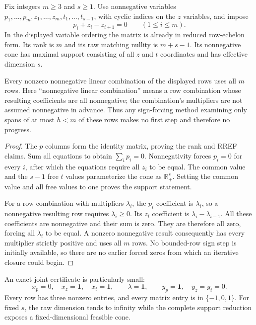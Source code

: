 \begin{theorem}
Fix integers $m\geq3$ and $s\geq1$.  Use nonnegative variables
$p_1,\ldots,p_m,z_1,\ldots,z_m,t_1,\ldots,t_{s-1}$, with cyclic
indices on the $z$ variables, and impose
\[
 p_i+z_i-z_{i+1}=0\qquad(1\leq i\leq m).
\]
In the displayed variable ordering the matrix is already in reduced
row-echelon form.  Its rank is $m$ and its raw matching nullity is
$m+s-1$.  Its nonnegative cone has maximal support consisting of all
$z$ and $t$ coordinates and has effective dimension $s$.

Every nonzero nonnegative linear combination of the displayed rows
uses all $m$ rows.  Here ``nonnegative linear combination'' means a
row combination whose resulting coefficients are all nonnegative;
the combination's multipliers are not assumed nonnegative in advance.
Thus any sign-forcing method examining only spans of at most $h<m$
of these rows makes no first step and therefore no progress.
\end{theorem}

\begin{proof}
The $p$ columns form the identity matrix, proving the rank and RREF
claims.  Sum all equations to obtain $\sum_i p_i=0$.  Nonnegativity
forces $p_i=0$ for every $i$, after which the equations require all
$z_i$ to be equal.  The common value and the $s-1$ free $t$ values
parameterize the cone as $\mathbb R_+^s$.  Setting the common value
and all free values to one proves the support statement.

For a row combination with multipliers $\lambda_i$, the $p_i$
coefficient is $\lambda_i$, so a nonnegative resulting row requires
$\lambda_i\geq0$.  Its $z_i$ coefficient is
$\lambda_i-\lambda_{i-1}$.  All these coefficients are nonnegative
and their sum is zero.  They are therefore all zero, forcing all
$\lambda_i$ to be equal.  A nonzero nonnegative result consequently
has every multiplier strictly positive and uses all $m$ rows.
No bounded-row sign step is initially available, so there are no
earlier forced zeros from which an iterative closure could begin.
\end{proof}

An exact joint certificate is particularly small:
\[
 x_p=0,\quad x_z=\mathbf1,\quad x_t=\mathbf1,
 \qquad \lambda=\mathbf1,
 \qquad y_p=\mathbf1,\quad y_z=y_t=0.
\]
Every row has three nonzero entries, and every matrix entry is in
$\{-1,0,1\}$.  For fixed $s$, the raw dimension tends to infinity
while the complete support reduction exposes a fixed-dimensional
feasible cone.


